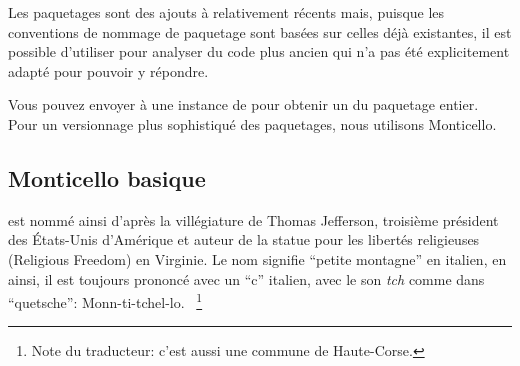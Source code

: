\documentclass[a4paper,10pt,twoside]{book}
\begin{document}
Les paquetages sont des ajouts \`a \sq relativement r\'ecents
mais, puisque les conventions de nommage de paquetage sont bas\'ees
sur celles d\'ej\`a existantes, il est possible d'utiliser
 pour analyser du code plus ancien qui n'a pas 
\'et\'e explicitement adapt\'e pour pouvoir y r\'epondre.


Vous pouvez envoyer  \`a une instance de  
pour obtenir un \changeset du paquetage entier.
Pour un versionnage plus sophistiqu\'e des paquetages, nous utilisons 
Monticello.

\subsection{Monticello basique}

 est nomm\'e ainsi d'apr\`es la vill\'egiature 
de Thomas Jefferson, troisi\`eme pr\'esident des \'Etats-Unis d'Am\'erique
et auteur de la statue pour les libert\'es religieuses (Religious Freedom) en
Virginie. Le nom signifie ``petite montagne'' en italien, en ainsi, il est
toujours prononc\'e avec un ``c'' italien, \ie avec le son \emph{tch} comme
dans ``quetsche'':
Monn-ti-tchel-lo.
~\footnote{Note du traducteur: c'est aussi une commune de Haute-Corse.}
\end{document}
